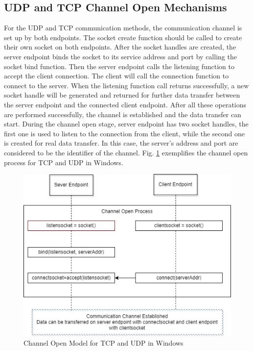 \subsection{UDP and TCP Channel Open Mechanisms} 
For the UDP and TCP communication methods, the communication channel is set up by both endpoints. The socket create function should be called to create their own socket on both endpoints. After the socket handles are created, the server endpoint binds the socket to its service address and port by calling the socket bind function. Then the server endpoint calls the listening function to accept the client connection. The client will call the connection function to connect to the server. When the listening function call returns successfully, a new socket handle will be generated and returned for further data transfer between the server endpoint and the connected client endpoint. After all these operations are performed successfully, the channel is established and the data transfer can start. During the channel open stage, server endpoint has two socket handles, the first one is used to listen to the connection from the client, while the second one is created for real data transfer. In this case, the server's address and port are considered to be the identifier of the channel. Fig. \ref{channelopen2} exemplifies the channel open process for TCP and UDP in Windows.
    
\begin{figure}[H]
\centerline{\includegraphics[scale=0.6]{Figures/tcpudpchannelopen}}
 \caption{Channel Open Model for TCP and UDP in Windows}
\label{channelopen2}    
\end{figure}

